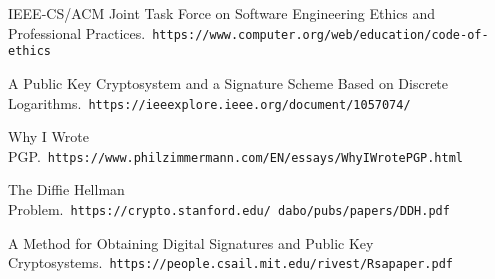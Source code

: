 \documentclass[12pt]{report}
\begin{document}
\newpage

\begin{thebibliography}{9}

    IEEE-CS/ACM Joint Task Force on Software Engineering Ethics and Professional Practices.\
    \texttt{https://www.computer.org/web/education/code-of-ethics}
    
    A Public Key Cryptosystem and a Signature Scheme Based on Discrete Logarithms.\
    \texttt{https://ieeexplore.ieee.org/document/1057074/}
    
    Why I Wrote PGP.\
    \texttt{https://www.philzimmermann.com/EN/essays/WhyIWrotePGP.html}
    
    \bibitem{stanford}
    The Diffie Hellman Problem.\
    \texttt{https://crypto.stanford.edu/~dabo/pubs/papers/DDH.pdf}
    
    \bibitem{mit}
    A Method for Obtaining Digital Signatures and Public Key Cryptosystems.\
    \texttt{https://people.csail.mit.edu/rivest/Rsapaper.pdf}

\end{thebibliography}
\end{document}
